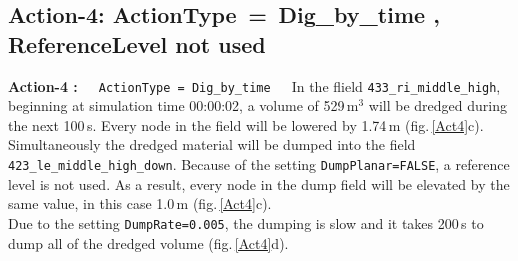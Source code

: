\newpage
\subsection{Action-4: ActionType\, = \,Dig\_by\_time , ReferenceLevel not used}
\label{ssec:E4Action4}
\textbf{Action-4 :}~~~\texttt{ActionType\,=\,Dig\_by\_time}~~~In the flield \texttt{433\_ri\_middle\_high},
beginning at simulation time 00:00:02, a volume of 529\,m$^3$ will be dredged during the next 100\,s.
Every node in the field will be lowered by 1.74\,m (fig.\,\ref{Act4}c).
Simultaneously the dredged material will be dumped into the field \texttt{423\_le\_middle\_high\_down}.
Because of the setting \texttt{DumpPlanar=FALSE}, a reference level is not used.
As a result, every node in the dump field will be elevated by the same value, in this case 1.0\,m (fig.\,\ref{Act4}c).\\
Due to the setting \texttt{DumpRate=0.005}, the dumping is slow and
it takes 200\,s to dump all of the dredged volume (fig.\,\ref{Act4}d).
\\
